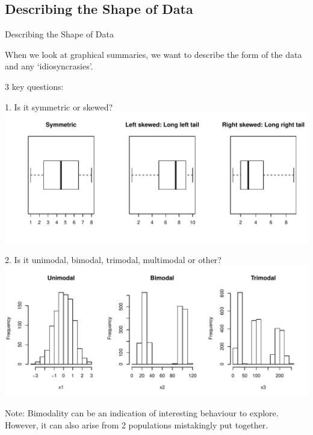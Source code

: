 \documentclass[t,xcolor=pdftex,dvipsnames,table]{beamer}\usepackage[]{graphicx}\usepackage[]{color}
\makeatletter
\def\maxwidth{ %
  \ifdim\Gin@nat@width>\linewidth
    \linewidth
  \else
    \Gin@nat@width
  \fi
}
\newenvironment{knitrout}{}{} %
\makeatother
\begin{document}
\subsection[]{Describing the Shape of Data}
\begin{frame}[fragile]{Describing the Shape of Data}

When we look at graphical summaries, we want to describe the form of the data and any ‘idiosyncrasies’.

\vspace{.5cm}
3 key questions:

1. Is it symmetric or skewed?
\begin{knitrout}
\color{fgcolor}
\includegraphics[width=\maxwidth]{figure/unnamed-chunk-19-1} 

\end{knitrout}
\end{frame}

\begin{frame}[fragile]{}

2. Is it unimodal, bimodal, trimodal, multimodal or other?
\begin{knitrout}
\color{fgcolor}
\includegraphics[width=\maxwidth]{figure/unnamed-chunk-20-1} 

\end{knitrout}

Note: Bimodality can be an indication of interesting behaviour to explore. However, it can also arise from 2 populations mistakingly put together. 
\end{frame}
\end{document}
